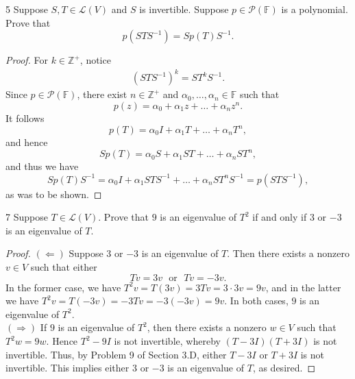 \documentclass{extarticle}
\newenvironment{problem}[1]{\begin{prob*}{#1}{}}{\end{prob*}}
\newcommand{\Z}{\mathbb{Z}}
\newcommand{\F}{\mathbb{F}}
\newcommand{\poly}{\mathcal{P}}
\newcommand{\Hom}{\mathcal{L}}
\begin{document}
\begin{problem}{5}
Suppose $S,T\in\Hom(V)$ and $S$ is invertible.  Suppose $p\in\poly(\F)$ is a polynomial.  Prove that 
\begin{equation*}
p\left(STS^{-1}\right) = Sp(T)S^{-1}.
\end{equation*}
\end{problem}
\begin{proof}
For $k\in\Z^+$, notice
\begin{align*}
\left(STS^{-1}\right)^k = ST^kS^{-1}.
\end{align*}
Since $p\in\poly(\F)$, there exist $n\in\Z^+$ and $\alpha_0,\dots,\alpha_n\in\F$ such that 
\begin{equation*}
p(z) = \alpha_0 + \alpha_1z + \dots + \alpha_n z^n. 
\end{equation*}
It follows
\begin{equation*}
p(T) = \alpha_0 I  + \alpha_1T + \dots + \alpha_nT^n,
\end{equation*}
and hence
\begin{equation*}
Sp(T) = \alpha_0 S + \alpha_1ST + \dots + \alpha_n ST^n,
\end{equation*}
and thus we have
\begin{equation*}
Sp(T)S^{-1} = \alpha_0 I + \alpha_1 STS^{-1} + \dots + \alpha_n ST^nS^{-1} = p\left(STS^{-1}\right),
\end{equation*}
as was to be shown.
\end{proof}

\begin{problem}{7}
Suppose $T\in\Hom(V)$.  Prove that $9$ is an eigenvalue of $T^2$ if and only if $3$ or $-3$ is an eigenvalue of $T$.
\end{problem}
\begin{proof}
$(\Leftarrow)$ Suppose $3$ or $-3$ is an eigenvalue of $T$.  Then there exists a nonzero $v\in V$ such that either 
\begin{equation*}
Tv = 3v ~~~\text{or}~~~ Tv = -3v.
\end{equation*}
In the former case, we have $T^2v = T(3v) = 3Tv = 3 \cdot 3v = 9v$, and in the latter we have $T^2v = T(-3v) = -3Tv = -3(-3v) = 9v$.  In both cases, $9$ is an eigenvalue of $T^2$.\\
\indent $(\Rightarrow)$ If $9$ is an eigenvalue of $T^2$, then there exists a nonzero $w\in V$ such that $T^2w = 9w$.  Hence $T^2 - 9I$ is not invertible, whereby $(T - 3I)(T + 3I)$ is not invertible.  Thus, by Problem 9 of Section 3.D, either $T-3I$ or $T+3I$ is not invertible.  This implies either $3$ or $-3$ is an eigenvalue of $T$, as desired.
\end{proof}
\end{document}
